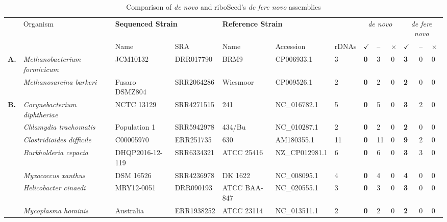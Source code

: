 \begin{table}
    \caption{Comparison of \textit{de novo} and riboSeed's \textit{de fere novo} assemblies}
  \label{table:phyla}
  \begin{tabular}{p{.05cm}p{4cm}p{2.45cm}p{1.60cm}p{2.12cm}p{1.85cm}p{.4cm}>{\hfill}p{.4cm}p{.15cm}p{.1cm}>{\hfill}p{.27cm}p{.15cm}p{.1cm}}
    \toprule
    & \multirow{2}{*}{Organism} & \multicolumn{2}{l}{\textbf{Sequenced Strain}}  &  \multicolumn{3}{l}{\textbf{Reference Strain}} &  \multicolumn{3}{c}{\textit{de novo}} & \multicolumn{3}{c}{\textit{de fere novo}} \\
    & & Name & SRA & Name & Accession & rDNAs & \textbf{$\checkmark$} & -- & $\times$ & \textbf{$\checkmark$} & -- & $\times$  \\
    \toprule
   \multirow{2}{*}{\textbf{A.}} & \textit{Methanobacterium formicicum} &   JCM10132                                              & DRR017790  & BRM9        &CP006933.1        & 3  & \textbf{0} & 3  & 0 & \textbf{3} & 0 & 0 \\
    & \textit{Methanosarcina    barkeri} &     Fusaro DSMZ804                                        & SRR2064286 & Wiesmoor    &CP009526.1        & 2  & \textbf{0} & 2  & 0 & \textbf{2} & 0 & 0 \\

    \midrule

    \multirow{7}{*}{\textbf{B.}}& \textit{Corynebacterium  diphtheriae} &   NCTC 13129      & SRR4271515 & 241 &  NC\_016782.1      & 5  & \textbf{0} & 5  & 0 & \textbf{3} & 2 & 0 \\
    & \textit{Chlamydia        trachomatis} &  Population 1 & SRR5942978 & 434/Bu & NC\_010287.1     & 2  & \textbf{0} & 2  & 0 & \textbf{2} & 0 & 0 \\
    & \textit{Clostridioides   difficile} &    C00005970                                             & ERR251735  & 630  &AM180355.1       & 11 & \textbf{0} & 11 & 0 & \textbf{9} & 2 & 0 \\
    & \textit{Burkholderia     cepacia} &      DHQP2016-12-119                                       & SRR6334321 & ATCC 25416       & NZ\_CP012981.1    & 6  & \textbf{0} & 6  & 0 & \textbf{3} & 3 & 0 \\
    & \textit{Myxococcus       xanthus} &      DSM 16526                                             & SRR4236978 & DK 1622 & NC\_008095.1
  & 4  & \textbf{0} & 4  & 0 & \textbf{4} & 0 & 0 \\
     & \textit{Helicobacter     cinaedi} &      MRY12-0051                                            & DRR090193  & ATCC BAA-847 & NC\_020555.1 & 3  & \textbf{0} & 3  & 0 & \textbf{3} & 0 & 0 \\
    & \textit{Mycoplasma       hominis} &      Australia                                             & ERR1938252 & ATCC 23114  &NC\_013511.1       & 2  & \textbf{0} & 2  & 0 & \textbf{2} & 0 & 0 \\


\end{tabular}
\end{table}
